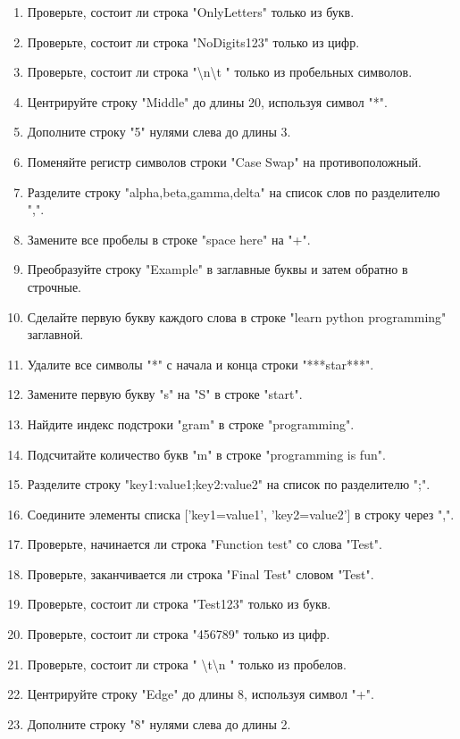 \documentclass[a4,12pt]{article}
\theoremstyle{remark}
\begin{document}
\begin{enumerate}
    \item Проверьте, состоит ли строка "OnlyLetters" только из букв.
    \item Проверьте, состоит ли строка "NoDigits123" только из цифр.
    \item Проверьте, состоит ли строка "\textbackslash n\textbackslash t " только из пробельных символов.
    \item Центрируйте строку "Middle" до длины 20, используя символ "*".
    \item Дополните строку "5" нулями слева до длины 3.
    \item Поменяйте регистр символов строки "Case Swap" на противоположный.
    \item Разделите строку "alpha,beta,gamma,delta" на список слов по разделителю ",".
    \item Замените все пробелы в строке "space here" на "+".
    \item Преобразуйте строку "Example" в заглавные буквы и затем обратно в строчные.
    \item Сделайте первую букву каждого слова в строке "learn python programming" заглавной.
    \item Удалите все символы "*" с начала и конца строки "***star***".
    \item Замените первую букву "s" на "S" в строке "start".
    \item Найдите индекс подстроки "gram" в строке "programming".
    \item Подсчитайте количество букв "m" в строке "programming is fun".
    \item Разделите строку "key1:value1;key2:value2" на список по разделителю ";".
    \item Соедините элементы списка ['key1=value1', 'key2=value2'] в строку через ",".
    \item Проверьте, начинается ли строка "Function test" со слова "Test".
    \item Проверьте, заканчивается ли строка "Final Test" словом "Test".
    \item Проверьте, состоит ли строка "Test123" только из букв.
    \item Проверьте, состоит ли строка "456789" только из цифр.
    \item Проверьте, состоит ли строка "  \textbackslash t\textbackslash n " только из пробелов.
    \item Центрируйте строку "Edge" до длины 8, используя символ "+".
    \item Дополните строку "8" нулями слева до длины 2.

\end{enumerate}
\end{document}
